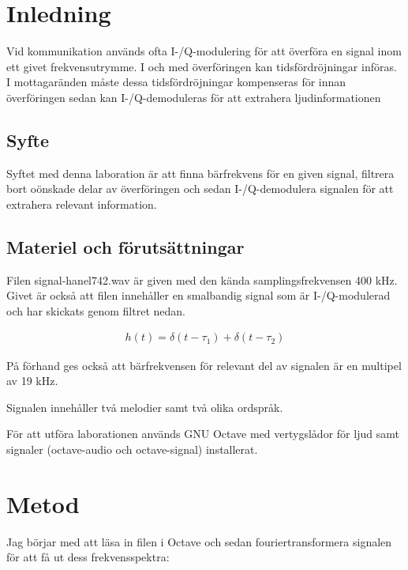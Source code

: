 \documentclass[a4paper,12pt,fleqn]{article}
\begin{document}
\section{Inledning}

Vid kommunikation används ofta I-/Q-modulering för att överföra en signal inom ett givet frekvensutrymme. I och med överföringen kan tidsfördröjningar införas. I mottagaränden måste dessa tidsfördröjningar kompenseras för innan överföringen sedan kan I-/Q-demoduleras för att extrahera ljudinformationen 

\subsection{Syfte}

Syftet med denna laboration är att finna bärfrekvens för en given signal, filtrera bort oönskade delar av överföringen och sedan I-/Q-demodulera signalen för att extrahera relevant information. 

\subsection{Materiel och förutsättningar}

Filen signal-hanel742.wav är given med den kända samplingsfrekvensen 400 kHz. Givet är också att filen innehåller en smalbandig signal som är I-/Q-modulerad och har skickats genom filtret nedan. 

\begin{gather}
h(t) = \delta(t - \tau_1) + \delta(t - \tau_2)
\label{equ:filter}
\end{gather}

På förhand ges också att bärfrekvensen för relevant del av signalen är en multipel av 19 kHz.

Signalen innehåller två melodier samt två olika ordspråk. 

För att utföra laborationen används GNU Octave med vertygslådor för ljud samt signaler (octave-audio och octave-signal) installerat. 

\newpage

\section{Metod}

Jag börjar med att läsa in filen i Octave och sedan fouriertransformera signalen för att få ut dess frekvensspektra: 
\end{document}
